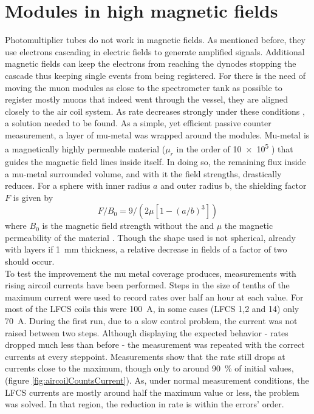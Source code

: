   \section{Modules in high magnetic fields}
  \label{ch:Analysis:sec:Modules in high magnetic fields}
  Photomultiplier tubes do not work in magnetic fields. As mentioned before, they use electrons cascading in electric fields to generate amplified signals. Additional magnetic fields can keep the electrons from reaching the dynodes stopping the cascade thus keeping single events from being registered. 
  For there is the need of moving the muon modules as close to the spectrometer tank as possible to register mostly muons that indeed went through the vessel, they are aligned closely to the air coil system. As rate decreases strongly under these conditions , a solution needed to be found. As a simple, yet efficient passive counter measurement, a layer of mu-metal was wrapped around the modules. Mu-metal is a magnetically highly permeable material ($\mu_r$ in the order of \SI{10e5}{} \cite{permeability}) that guides the magnetic field lines inside itself. In doing so, the remaining flux inside a mu-metal surrounded volume, and with it the field strengths, drastically reduces.
  For a sphere with inner radius $a$ and outer radius b, the shielding factor $ F$ is given by
  \begin{equation}
  	F/B_0 = 9/\left(2\mu\left[1-(a/b)^3\right]\right)
  \end{equation}
  where $B_0$ is the magnetic field strength without the and $\mu$ the magnetic permeability of the material \cite{shielding}. Though the shape used is not spherical, already with layers if \SI{1}{\mm} thickness, a relative decrease in fields of a factor of two should occur.\\
  To test the improvement the mu metal coverage produces, measurements with rising aircoil currents have been performed.
  Steps in the size of tenths of the maximum current were used to record rates over half an hour at each value. For most of the LFCS coils this were \SI{100}{\ampere}, in some cases (LFCS 1,2 and 14) only \SI{70}{\ampere}.
  During the first run, due to a slow control problem, the current was not raised between two steps. Although displaying the expected behavior - rates dropped much less than before - the measurement was repeated with the correct currents at every steppoint.
  Measurements show that the rate still drops at currents close to the maximum, though only to around \SI{90}{\percent} of initial values, (figure \ref{fig:aircoilCountsCurrent}). As, under normal measurement conditions, the LFCS currents are mostly around half the maximum value or less, the problem was solved. In that region,  the reduction in rate is within the errors' order.
